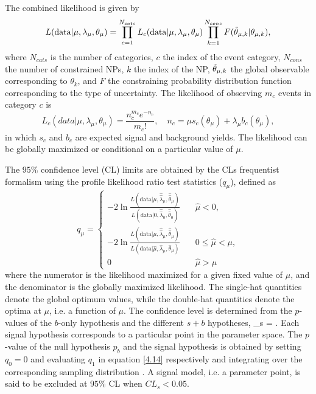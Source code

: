 The combined likelihood is given by
\begin{equation}
    \label{4.13}
    L(\mathrm{data}|\mu,\lambda_{\mu},\theta_{\mu})= \prod_{c=1}^{N_{cats}} {L}_c(\mathrm{data}|\mu, \lambda_{\mu}, \theta_{\mu}) \prod_{k=1}^{N_{cons}} {F}(\Tilde{\theta}_{\mu, k}|\theta_{\mu, k}),
\end{equation}
where $N_{cats}$ is the number of categories, $c$ the index of the event category, $N_{cons}$ the number of constrained NPs, $k$ the index of the NP, $\Tilde{\theta}_{\mu, k}$ the global observable corresponding to $\theta_k$, and $F$ the constraining probability distribution function corresponding to the type of uncertainty. 
The likelihood of observing $m_c$ events in category $c$ is
\begin{equation}
    \label{chap:phys-anal:14}
    L_c(data|\mu, \lambda_{\mu}, \theta_{\mu}) = \frac{n_c^{m_c}e^{-n_c}}{m_c!}, \quad n_c = \mu s_c(\theta_{\mu}) + \lambda_{\mu}b_c(\theta_{\mu}),
\end{equation}
in which $s_c$ and $b_c$ are expected signal and background yields.
The likelihood can be globally maximized or conditional on a particular value of $\mu$.

The $95\%$ confidence level (CL) limits are obtained by the CLs frequentist formalism \cite{ReadCLs} using the profile likelihood ratio test statistics ($q_{\mu}$)\cite{Cowan:2010js}, defined as 
\begin{equation}
    \label{4.14}
    q_{\mu} = \begin{cases} 
     -2\ln\frac{L(\mathrm{data}|\mu,\hat{\hat{\lambda}}_{\mu},\hat{\hat{\theta}}_{\mu})}{L(\mathrm{data}|0,\hat{\hat{\lambda}}_{0},\hat{\hat{\theta}}_{0})}\quad &  \hat{\mu}<0, \\
        -2\ln\frac{L(\mathrm{data}|\mu,\hat{\hat{\lambda}}_{\mu},\hat{\hat{\theta}}_{\mu})}{L(\mathrm{data}|\hat{\mu},\hat{\lambda}_{\mu},\hat{\theta}_{\mu})}\quad & 0\le \hat{\mu}<\mu, \\
        0 \quad & \hat{\mu} > \mu
    \end{cases}
\end{equation}
where the numerator is the likelihood maximized for a given fixed value of $\mu$, and the denominator is the globally maximized likelihood. The single-hat quantities denote the global optimum values, while the double-hat quantities denote the optima at $\mu$, i.e. a function of $\mu$.
The confidence level is determined from the $p$-values of the $b$-only hypothesis and the different $s+b$ hypotheses,
\beq
\label{chap:phys-ana:15}
_s = .
\eeq
Each signal hypothesis corresponds to a particular point in the parameter space.
The $p$-value of the null hypothesis $p_b$ and the signal hypothesis is obtained by setting $q_0=0$ and evaluating $q_1$ in equation \eqref{4.14} respectively and integrating over the corresponding sampling distribution \cite{Cowan:2010js}.
A signal model, i.e. a parameter point, is said to be excluded at $95\%$ CL when $CL_s<0.05$. 


